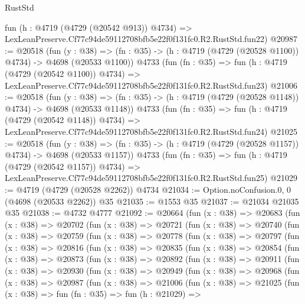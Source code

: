 \begin{lexlean}{RustStd}
\begin{coremodule}
    fun (h : @4719 (@4729 (@20542 @913)) @4734) =>
    LexLeanPreserve.Cf77c94de59112708bfb5e22f0f131fc0.R2.RustStd.fun22)
@20987 := @20518
    (fun (y : @38) =>
    (fn : @35) -> (h : @4719 (@4729 (@20528 @1100)) @4734) -> @4698 (@20533 @1100))
    @4733
    (fun (fn : @35) =>
    fun (h : @4719 (@4729 (@20542 @1100)) @4734) =>
    LexLeanPreserve.Cf77c94de59112708bfb5e22f0f131fc0.R2.RustStd.fun23)
@21006 := @20518
    (fun (y : @38) =>
    (fn : @35) -> (h : @4719 (@4729 (@20528 @1148)) @4734) -> @4698 (@20533 @1148))
    @4733
    (fun (fn : @35) =>
    fun (h : @4719 (@4729 (@20542 @1148)) @4734) =>
    LexLeanPreserve.Cf77c94de59112708bfb5e22f0f131fc0.R2.RustStd.fun24)
@21025 := @20518
    (fun (y : @38) =>
    (fn : @35) -> (h : @4719 (@4729 (@20528 @1157)) @4734) -> @4698 (@20533 @1157))
    @4733
    (fun (fn : @35) =>
    fun (h : @4719 (@4729 (@20542 @1157)) @4734) =>
    LexLeanPreserve.Cf77c94de59112708bfb5e22f0f131fc0.R2.RustStd.fun25)
@21029 := @4719 (@4729 (@20528 @2262)) @4734
@21034 := Option.noConfusion.{0, 0} (@4698 (@20533 @2262)) @35
@21035 := @1553 @35
@21037 := @21034 @21035 @35
@21038 := @4732 @4777
@21092 := @20664
    (fun (x : @38) =>
    @20683
      (fun (x : @38) =>
      @20702
        (fun (x : @38) =>
        @20721
          (fun (x : @38) =>
          @20740
            (fun (x : @38) =>
            @20759
              (fun (x : @38) =>
              @20778
                (fun (x : @38) =>
                @20797
                  (fun (x : @38) =>
                  @20816
                    (fun (x : @38) =>
                    @20835
                      (fun (x : @38) =>
                      @20854
                        (fun (x : @38) =>
                        @20873
                          (fun (x : @38) =>
                          @20892
                            (fun (x : @38) =>
                            @20911
                              (fun (x : @38) =>
                              @20930
                                (fun (x : @38) =>
                                @20949
                                  (fun (x : @38) =>
                                  @20968
                                    (fun (x : @38) =>
                                    @20987
                                      (fun (x : @38) =>
                                      @21006
                                        (fun (x : @38) =>
                                        @21025
                                          (fun (x : @38) =>
                                          fun (fn : @35) =>
                                          fun (h : @21029) =>

\end{coremodule}
\end{lexlean}
